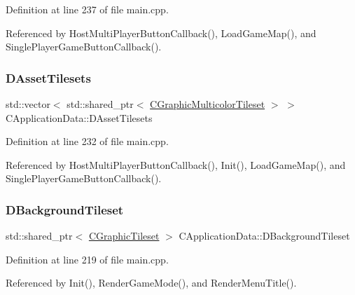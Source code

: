 Definition at line 237 of file main.\+cpp.



Referenced by Host\+Multi\+Player\+Button\+Callback(), Load\+Game\+Map(), and Single\+Player\+Game\+Button\+Callback().

\hypertarget{classCApplicationData_a1aaf56a300b30c5e2484a5359366d77a}{}\label{classCApplicationData_a1aaf56a300b30c5e2484a5359366d77a} 
\subsubsection{\texorpdfstring{D\+Asset\+Tilesets}{DAssetTilesets}}
{\footnotesize\ttfamily std\+::vector$<$ std\+::shared\+\_\+ptr$<$ \hyperlink{classCGraphicMulticolorTileset}{C\+Graphic\+Multicolor\+Tileset} $>$ $>$ C\+Application\+Data\+::\+D\+Asset\+Tilesets\hspace{0.3cm}{\ttfamily [protected]}}



Definition at line 232 of file main.\+cpp.



Referenced by Host\+Multi\+Player\+Button\+Callback(), Init(), Load\+Game\+Map(), and Single\+Player\+Game\+Button\+Callback().

\hypertarget{classCApplicationData_a93e478c5552a527fe2d680cac8fc910d}{}\label{classCApplicationData_a93e478c5552a527fe2d680cac8fc910d} 
\subsubsection{\texorpdfstring{D\+Background\+Tileset}{DBackgroundTileset}}
{\footnotesize\ttfamily std\+::shared\+\_\+ptr$<$ \hyperlink{classCGraphicTileset}{C\+Graphic\+Tileset} $>$ C\+Application\+Data\+::\+D\+Background\+Tileset\hspace{0.3cm}{\ttfamily [protected]}}



Definition at line 219 of file main.\+cpp.



Referenced by Init(), Render\+Game\+Mode(), and Render\+Menu\+Title().


